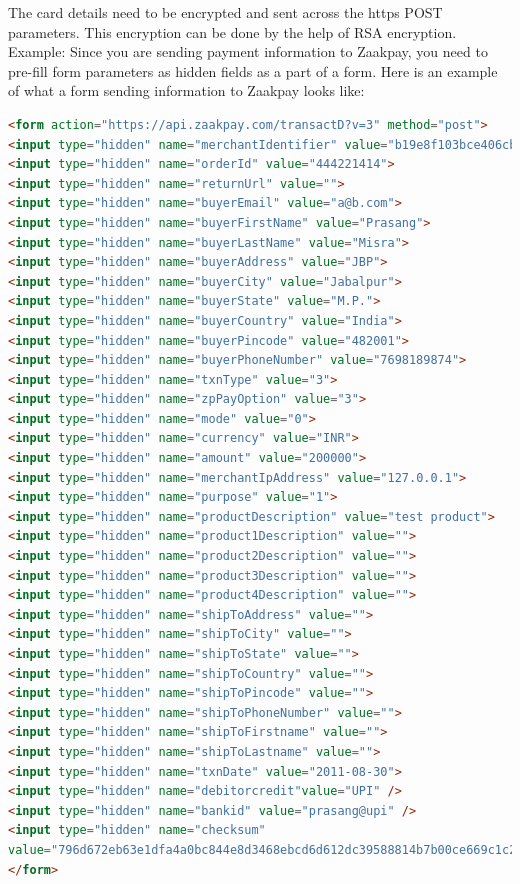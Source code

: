 \documentclass{article}
\begin{document}
The card details need to be encrypted and sent across the https POST parameters. This encryption can be done by the help of RSA encryption.
Example:
Since you are sending payment information to Zaakpay, you need to pre-fill form parameters as hidden
fields as a part of a form. Here is an example of what a form sending information to Zaakpay looks
like:

\begin{lstlisting}[language=html,breaklines=true]
<form action="https://api.zaakpay.com/transactD?v=3" method="post">
<input type="hidden" name="merchantIdentifier" value="b19e8f103bce406cbd">
<input type="hidden" name="orderId" value="444221414">
<input type="hidden" name="returnUrl" value="">
<input type="hidden" name="buyerEmail" value="a@b.com">
<input type="hidden" name="buyerFirstName" value="Prasang">
<input type="hidden" name="buyerLastName" value="Misra">
<input type="hidden" name="buyerAddress" value="JBP">
<input type="hidden" name="buyerCity" value="Jabalpur">
<input type="hidden" name="buyerState" value="M.P.">
<input type="hidden" name="buyerCountry" value="India">
<input type="hidden" name="buyerPincode" value="482001">
<input type="hidden" name="buyerPhoneNumber" value="7698189874">
<input type="hidden" name="txnType" value="3">
<input type="hidden" name="zpPayOption" value="3">
<input type="hidden" name="mode" value="0">
<input type="hidden" name="currency" value="INR">
<input type="hidden" name="amount" value="200000">
<input type="hidden" name="merchantIpAddress" value="127.0.0.1">
<input type="hidden" name="purpose" value="1">
<input type="hidden" name="productDescription" value="test product">
<input type="hidden" name="product1Description" value="">
<input type="hidden" name="product2Description" value="">
<input type="hidden" name="product3Description" value="">
<input type="hidden" name="product4Description" value="">
<input type="hidden" name="shipToAddress" value="">
<input type="hidden" name="shipToCity" value="">
<input type="hidden" name="shipToState" value="">
<input type="hidden" name="shipToCountry" value="">
<input type="hidden" name="shipToPincode" value="">
<input type="hidden" name="shipToPhoneNumber" value="">
<input type="hidden" name="shipToFirstname" value="">
<input type="hidden" name="shipToLastname" value="">
<input type="hidden" name="txnDate" value="2011-08-30">
<input type="hidden" name="debitorcredit"value="UPI" />
<input type="hidden" name="bankid" value="prasang@upi" />
<input type="hidden" name="checksum"
value="796d672eb63e1dfa4a0bc844e8d3468ebcd6d612dc39588814b7b00ce669c1c2">
</form>
\end{lstlisting}
\end{document}
